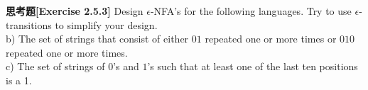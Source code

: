 \textbf{思考题[Exercise 2.5.3]} Design $\epsilon$-NFA's for the following languages. 
Try to use $\epsilon$-transitions to simplify your design.\\
b) The set of strings that consist of either $01$ repeated one or more times 
or $010$ repeated one or more times.\\
c) The set of strings of $0$'s and $1$'s such that at least one of the 
last ten positions is a 1.